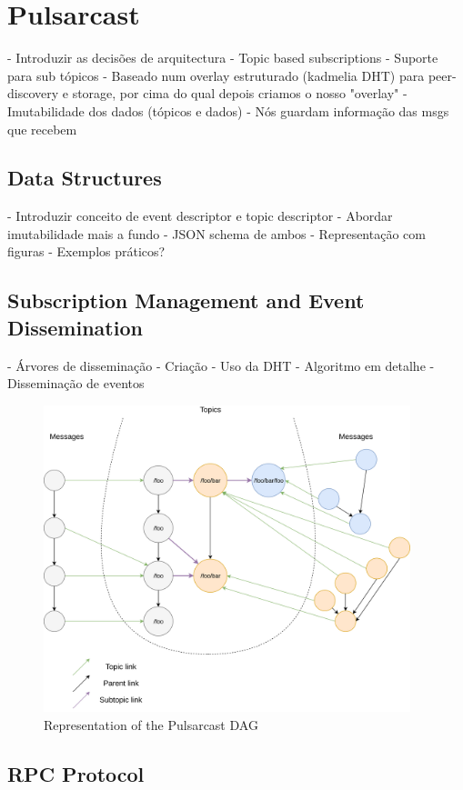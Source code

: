 
\chapter{Pulsarcast}
\label{chapter:pulsarcast}

- Introduzir as decisões de arquitectura
  - Topic based subscriptions
  - Suporte para sub tópicos
  - Baseado num overlay estruturado (kadmelia DHT) para peer-discovery e
  storage, por cima do qual depois criamos o nosso "overlay"
  - Imutabilidade dos dados (tópicos e dados)
  - Nós guardam informação das msgs que recebem


\section{Data Structures}
- Introduzir conceito de event descriptor e topic descriptor
- Abordar imutabilidade mais a fundo
- JSON schema de ambos
- Representação com figuras
- Exemplos práticos?

\section{Subscription Management and Event Dissemination}
- Árvores de disseminação
  - Criação
  - Uso da DHT
  - Algoritmo em detalhe
- Disseminação de eventos


\begin{figure}[hb!]
  \centering
  \includegraphics[width=0.95\textwidth]{img/pulsarcast-dag.png}
  \caption{Representation of the Pulsarcast DAG}
  \label{fig:pulsarcast-dag}
\end{figure}


\section{RPC Protocol}
